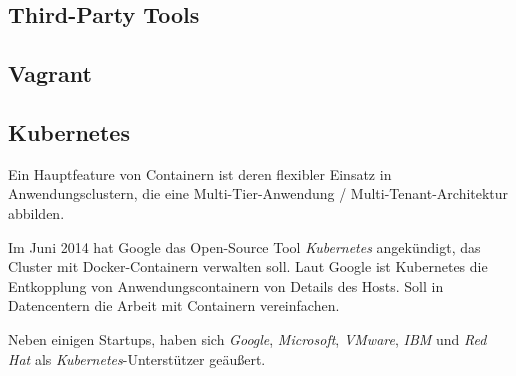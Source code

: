 \documentclass[../main.tex]{subfiles}
\begin{document}
    \subsection{Third-Party Tools}
  		\subsection{Vagrant}
  		\subsection{Kubernetes}

        Ein Hauptfeature von Containern ist deren flexibler Einsatz in Anwendungsclustern, die eine Multi-Tier-Anwendung / Multi-Tenant-Architektur abbilden.

        Im Juni 2014 hat Google das Open-Source Tool \emph{Kubernetes} angekündigt, das Cluster mit Docker-Containern verwalten soll. Laut Google ist Kubernetes die Entkopplung von Anwendungscontainern von Details des Hosts.
        Soll in Datencentern die Arbeit mit Containern vereinfachen.

        Neben einigen Startups, haben sich \emph{Google}, \emph{Microsoft}, \emph{VMware}, \emph{IBM} und \emph{Red Hat} als \emph{Kubernetes}-Unterstützer geäußert.
\end{document}
